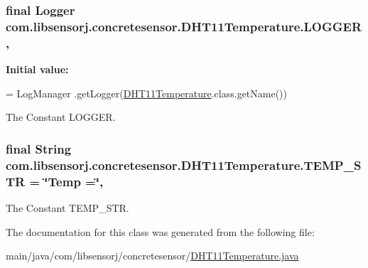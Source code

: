 \subsubsection[{L\+O\+G\+G\+E\+R}]{\setlength{\rightskip}{0pt plus 5cm}final Logger com.\+libsensorj.\+concretesensor.\+D\+H\+T11\+Temperature.\+L\+O\+G\+G\+E\+R\hspace{0.3cm}{\ttfamily [static]}, {\ttfamily [private]}}\label{classcom_1_1libsensorj_1_1concretesensor_1_1DHT11Temperature_a96d485fc09496c1b5a320a30bb3400c9}
{\bfseries Initial value\+:}
\begin{DoxyCode}
= LogManager
            .getLogger(\hyperlink{classcom_1_1libsensorj_1_1concretesensor_1_1DHT11Temperature_a02bbdf30c922adcbde84597bf698ff41}{DHT11Temperature}.class.getName())
\end{DoxyCode}
The Constant L\+O\+G\+G\+E\+R. \hypertarget{classcom_1_1libsensorj_1_1concretesensor_1_1DHT11Temperature_a123ae6845e0cc1d1ec859cf7cfb78004}{}
\subsubsection[{T\+E\+M\+P\+\_\+\+S\+T\+R}]{\setlength{\rightskip}{0pt plus 5cm}final String com.\+libsensorj.\+concretesensor.\+D\+H\+T11\+Temperature.\+T\+E\+M\+P\+\_\+\+S\+T\+R = \char`\"{}Temp =\char`\"{}\hspace{0.3cm}{\ttfamily [static]}, {\ttfamily [private]}}\label{classcom_1_1libsensorj_1_1concretesensor_1_1DHT11Temperature_a123ae6845e0cc1d1ec859cf7cfb78004}
The Constant T\+E\+M\+P\+\_\+\+S\+T\+R. 

The documentation for this class was generated from the following file\+:\begin{DoxyCompactItemize}
\item 
main/java/com/libsensorj/concretesensor/\hyperlink{DHT11Temperature_8java}{D\+H\+T11\+Temperature.\+java}\end{DoxyCompactItemize}
